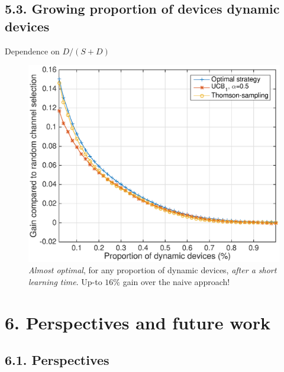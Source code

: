 \documentclass[12pt,english,ignorenonframetext,]{beamer}
\begin{document}
\subsection{\hfill{}5.3. Growing proportion of devices dynamic devices\hfill{}}

\begin{frame}{Dependence on \(D/(S+D)\)}

\begin{figure}[h!]
\centering
\includegraphics[height=0.65\textheight]{perf_learning.eps}
\caption{\small{\emph{Almost optimal}, for any proportion of dynamic devices, \emph{after a short learning time}. Up-to $16\%$ gain over the naive approach!}}
\end{figure}

\end{frame}



\section{\hfill{}6. Perspectives and future work\hfill{}}

\subsection{\hfill{}6.1. Perspectives\hfill{}}
\end{document}
